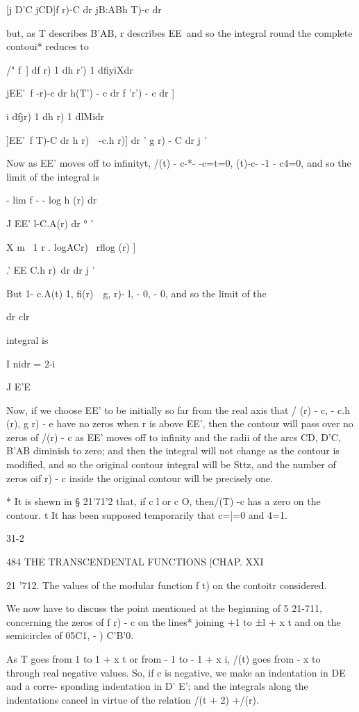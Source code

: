 [j D'C jCD]f r)-C dr jB:ABh T)-c dr

but, as T describes B'AB, r describes EE\ and so the integral round
the complete contoui* reduces to

/" f\ ] df r) 1 dh r') 1 dfiyiXdr

jEE'\ f -r)-c dr h(T') - c dr f 'r') - c dr ]

 i dfjr) 1 dh r) 1 dlMidr

]EE'\ f T)-C dr h r)\ \ -c.h r)] dr ' g r) - C dr j '

Now as EE' moves off to infinityt, /(t) - c-*- -c=t=0, (t)-c- -1 -
c4=0, and so the limit of the integral is

- lim f - - log h (r) dr

J EE' l-C.A(r) dr ° '

 X m \ 1 r . logACr) \ rflog (r) ]

.' EE C.h r)\ dr dr j '

But 1- c.A(t) 1, fi(r)~ \,g, r)- l, - 0, - 0, and so the limit of the

dr clr

integral is

I nidr = 2-i

J E'E

Now, if we choose EE' to be initially so far from the real axis that /
(r) - c, - c.h (r), g r) - e have no zeros when r is above EE', then
the contour will pass over no zeros of /(r) - c as EE' moves off to
infinity and the radii of the arcs CD, D'C, B'AB diminish to zero;
and then the integral will not change as the contour is modified, and
so the original contour integral will be Sttz, and the number of zeros
oif r) - c inside the original contour will be precisely one.

* It is shewn in § 21'71'2 that, if c l or c O, then/(T) -c has a zero
on the contour. t It has been supposed temporarily that c=|=0 and 4=1.

31-2

484 THE TRANSCENDENTAL FUNCTIONS [CHAP. XXI

21 '712. The values of the modular function f t) on the contoitr
considered.

We now have to discuss the point mentioned at the beginning of 5
21-711, concerning the zeros of f r) - c on the lines* joining +1 to
±l + x t and on the semicircles of 05C1, - ) C'B'0.

As T goes from 1 to 1 + x t or from - 1 to - 1 + x i, /(t) goes from -
x to through real negative values. So, if c is negative, we make an
indentation in DE and a corre- sponding indentation in D' E'; and the
integrals along the indentations cancel in virtue of the relation /(t
+ 2) +/(r).

